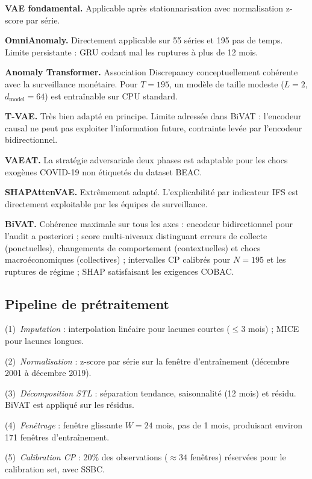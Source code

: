 \documentclass[12pt,a4paper]{article}
\begin{document}
\textbf{VAE fondamental.} Applicable après stationnarisation avec normalisation
z-score par série.

\textbf{OmniAnomaly.} Directement applicable sur 55 séries et 195 pas de temps.
Limite persistante : GRU codant mal les ruptures à plus de 12 mois.

\textbf{Anomaly Transformer.} Association Discrepancy conceptuellement cohérente
avec la surveillance monétaire. Pour $T = 195$, un modèle de taille modeste
($L = 2$, $d_{\mathrm{model}} = 64$) est entraînable sur CPU standard.

\textbf{T-VAE.} Très bien adapté en principe. Limite adressée dans BiVAT :
l'encodeur causal ne peut pas exploiter l'information future, contrainte levée
par l'encodeur bidirectionnel.

\textbf{VAEAT.} La stratégie adversariale deux phases est adaptable pour les
chocs exogènes COVID-19 non étiquetés du dataset BEAC.

\textbf{SHAPAttenVAE.} Extrêmement adapté. L'explicabilité par indicateur IFS
est directement exploitable par les équipes de surveillance.

\textbf{BiVAT.} Cohérence maximale sur tous les axes : encodeur bidirectionnel
pour l'audit a posteriori ; score multi-niveaux distinguant erreurs de collecte
(ponctuelles), changements de comportement (contextuelles) et chocs
macroéconomiques (collectives) ; intervalles CP calibrés pour $N = 195$ et les
ruptures de régime ; SHAP satisfaisant les exigences COBAC.

\subsection{Pipeline de prétraitement}

(1)~\textit{Imputation} : interpolation linéaire pour lacunes courtes ($\leq 3$
mois) ; MICE pour lacunes longues.

(2)~\textit{Normalisation} : z-score par série sur la fenêtre d'entraînement
(décembre 2001 à décembre 2019).

(3)~\textit{Décomposition STL} : séparation tendance, saisonnalité (12 mois)
et résidu. BiVAT est appliqué sur les résidus.

(4)~\textit{Fenêtrage} : fenêtre glissante $W = 24$ mois, pas de 1 mois,
produisant environ 171 fenêtres d'entraînement.

(5)~\textit{Calibration CP} : 20\% des observations ($\approx 34$ fenêtres)
réservées pour le calibration set, avec SSBC.
\end{document}

